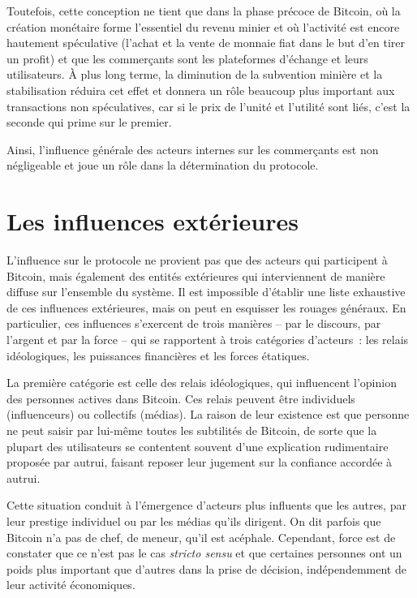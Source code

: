 Toutefois, cette conception ne tient que dans la phase précoce de Bitcoin, où la création monétaire forme l'essentiel du revenu minier et où l'activité est encore hautement spéculative (l'achat et la vente de monnaie fiat dans le but d'en tirer un profit) et que les commerçants sont les plateformes d'échange et leurs utilisateurs. À plus long terme, la diminution de la subvention minière et la stabilisation réduira cet effet et donnera un rôle beaucoup plus important aux transactions non spéculatives, car si le prix de l'unité et l'utilité sont liés, c'est la seconde qui prime sur le premier.

Ainsi, l'influence générale des acteurs internes sur les commerçants est non négligeable et joue un rôle dans la détermination du protocole.

\section*{Les influences extérieures}

L'influence sur le protocole ne provient pas que des acteurs qui participent à Bitcoin, mais également des entités extérieures qui interviennent de manière diffuse sur l'ensemble du système. Il est impossible d'établir une liste exhaustive de ces influences extérieures, mais on peut en esquisser les rouages généraux. En particulier, ces influences s'exercent de trois manières -- par le discours, par l'argent et par la force -- qui se rapportent à trois catégories d'acteurs~: les relais idéologiques, les puissances financières et les forces étatiques.


La première catégorie est celle des relais idéologiques, qui influencent l'opinion des personnes actives dans Bitcoin. Ces relais peuvent être individuels (influenceurs) ou collectifs (médias). La raison de leur existence est que personne ne peut saisir par lui-même toutes les subtilités de Bitcoin, de sorte que la plupart des utilisateurs se contentent souvent d'une explication rudimentaire proposée par autrui, faisant reposer leur jugement sur la confiance accordée à autrui.

Cette situation conduit à l'émergence d'acteurs plus influents que les autres, par leur prestige individuel ou par les médias qu'ils dirigent. On dit parfois que Bitcoin n'a pas de chef, de meneur, qu'il est acéphale. Cependant, force est de constater que ce n'est pas le cas \emph{stricto sensu} et que certaines personnes ont un poids plus important que d'autres dans la prise de décision, indépendemment de leur activité économiques.

